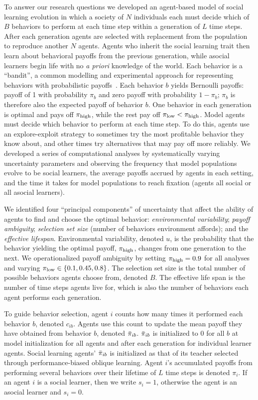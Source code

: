 \documentclass[letterpaper,11.5pt]{scrartcl}
\begin{document}
To answer our research questions
we developed an agent-based model of social learning evolution in which a society of
$N$ individuals each must decide which of $B$ behaviors to perform at each time step
within a generation of $L$ time steps. After each generation agents are selected
with replacement from the population to reproduce another $N$ agents. Agents who
inherit the social learning trait then learn about behavioral payoffs from the
previous generation, while asocial learners begin life with no \emph{a priori}
knowledge of the world.  Each behavior is a ``bandit'', a common modelling and
experimental approach for representing behaviors with probabilistic
payoffs~\cite{SuttonBartoBook,McElreath2005,Rendell2010,Schulz2019}.  Each behavior
$b$ yields Bernoulli payoffs: payoff of 1 with probability $\pi_b$ and zero payoff
with probability $1 - \pi_b$; $\pi_b$ is therefore also the expected payoff of
behavior $b$. One behavior in each generation is optimal and pays off $\pi_{\mathrm{high}}$,
while the rest pay off $\pi_{\mathrm{low}} < \pi_{\mathrm{high}}$.  Model agents must decide which behavior to
perform at each time step.  To do this, agents use an explore-exploit strategy to
sometimes try the most profitable behavior they know about, and other times try
alternatives that may pay off more reliably.  We developed a series of computational
analyses by systematically varying uncertainty parameters and observing the
frequency that model populations evolve to be social learners, the average payoffs
accrued by agents in each setting, and the time it takes for model populations to
reach fixation (agents all social or all asocial learners).

We identified four ``principal components'' of uncertainty that affect the
ability of agents to find and choose the optimal behavior: 
\emph{environmental variability}; \emph{payoff ambiguity}; \emph{selection set size}
(number of behaviors environment affords); and the \emph{effective lifespan}.
Environmental variability, denoted $u$, is the probability that the behavior
yielding the optimal payoff, $\pi_{\mathrm{high}}$, changes from one generation to the next.
We operationalized payoff ambiguity by setting $\pi_{\mathrm{high}} = 0.9$ for all analyses
and varying $\pi_{\mathrm{low}} \in \{0.1, 0.45, 0.8\}$. The selection set size is the
total number of possible behaviors agents choose from, denoted $B$. The 
effective life span is the number of time steps agents live for, which is
also the number of behaviors each agent performs each generation.

To guide behavior selection, agent $i$ counts how many times it
performed each behavior $b$, denoted $c_{ib}$. Agents use this count to 
update the mean payoff they have obtained from behavior $b$, denoted $\bar\pi_{ib}$.
$\bar\pi_{ib}$ is initialized to 0 for all $b$ at model initialization for
all agents and after each generation for individual learner agents. Social
learning agents' $\bar\pi_{ib}$ is initialized as that of its teacher selected
through performance-biased oblique learning. Agent $i$'s accumulated payoffs
from performing several behaviors over their lifetime of $L$ time steps is
denoted $\pi_{i}$. If an agent $i$ is a social learner, then we write $s_i = 1$,
otherwise the agent is an asocial learner and $s_i = 0$.
\end{document}

